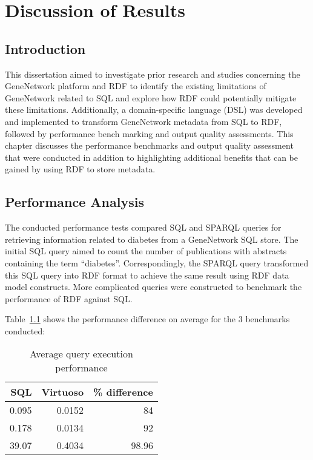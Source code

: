 \chapter{Discussion of Results}

\section{Introduction}

This dissertation aimed to investigate prior research and studies concerning the GeneNetwork platform and RDF to identify the existing limitations of GeneNetwork related to SQL and explore how RDF could potentially mitigate these limitations.  Additionally, a domain-specific language (DSL) was developed and implemented to transform GeneNetwork metadata from SQL to RDF, followed by performance bench marking and output quality assessments.  This chapter discusses the performance benchmarks and output quality assessment that were conducted in addition to highlighting additional benefits that can be gained by using RDF to store metadata.


\section{Performance Analysis}

The conducted performance tests compared SQL and SPARQL queries for retrieving information related to diabetes from a GeneNetwork SQL store.  The initial SQL query aimed to count the number of publications with abstracts containing the term ``diabetes''.  Correspondingly, the SPARQL query transformed this SQL query into RDF format to achieve the same result using RDF data model constructs.  More complicated queries were constructed to benchmark the performance of RDF against SQL.\@

Table~\ref{table:avg-query-exec} shows the performance difference on average for the 3 benchmarks conducted:

\begin{table}[H]
\begin{tabular}{rrr}
SQL & Virtuoso & \% difference\\[0pt]
\toprule
0.095 & 0.0152 & 84\\[0pt]
0.178 & 0.0134 & 92\\[0pt]
39.07 & 0.4034 & 98.96\\[0pt]
\end{tabular}
\caption{Average query execution performance}\label{table:avg-query-exec}
\end{table}

